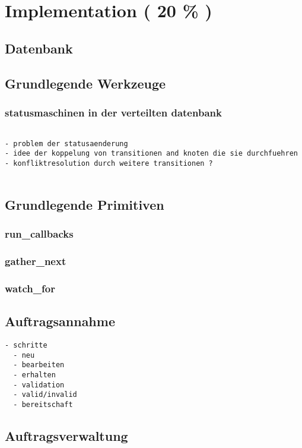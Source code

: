 \chapter{Implementation ( 20 \% ) }
\section{Datenbank}
\section{Grundlegende Werkzeuge}
\subsection{statusmaschinen in der verteilten datenbank}

\begin{verbatim}

- problem der statusaenderung
- idee der koppelung von transitionen and knoten die sie durchfuehren
- konfliktresolution durch weitere transitionen ?


\end{verbatim}
\section{Grundlegende Primitiven}

\subsection{run\_callbacks}
\subsection{gather\_next}
\subsection{watch\_for}



\section{Auftragsannahme}

\begin{verbatim}
- schritte
  - neu
  - bearbeiten
  - erhalten
  - validation
  - valid/invalid
  - bereitschaft
\end{verbatim}

\section{Auftragsverwaltung}

